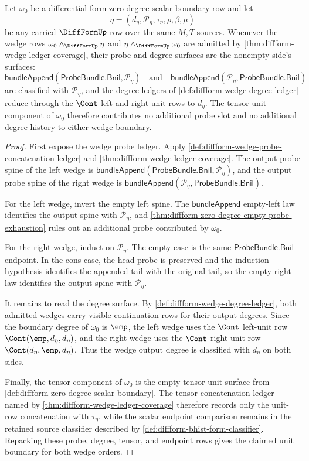 \begin{theorem}
\label{thm:diffform-zero-degree-wedge-cont-unit-boundary}
Let $\omega_0$ be a differential-form zero-degree scalar boundary row and let
$$
\eta=(d_\eta,\mathcal{P}_\eta,\tau_\eta,\rho,\beta,\mu)
$$
be any carried $\DiffFormUp$ row over the same $M,T$ sources. Whenever the
wedge rows $\omega_0\wedge_{\DiffFormUp}\eta$ and
$\eta\wedge_{\DiffFormUp}\omega_0$ are admitted by
\autoref{thm:diffform-wedge-ledger-coverage}, their probe and degree surfaces
are the nonempty side's surfaces:
$$
\mathsf{bundleAppend}(\mathsf{ProbeBundle.Bnil},\mathcal{P}_\eta)
\quad\text{and}\quad
\mathsf{bundleAppend}(\mathcal{P}_\eta,\mathsf{ProbeBundle.Bnil})
$$
are classified with $\mathcal{P}_\eta$, and the degree ledgers of
\autoref{def:diffform-wedge-degree-ledger} reduce through the $\Cont$ left
and right unit rows to $d_\eta$. The tensor-unit component of $\omega_0$
therefore contributes no additional probe slot and no additional degree
history to either wedge boundary.
\end{theorem}
\begin{proof}
First expose the wedge probe ledger. Apply
\autoref{def:diffform-wedge-probe-concatenation-ledger} and
\autoref{thm:diffform-wedge-ledger-coverage}. The output probe spine of the
left wedge is
$\mathsf{bundleAppend}(\mathsf{ProbeBundle.Bnil},\mathcal{P}_\eta)$, and the
output probe spine of the right wedge is
$\mathsf{bundleAppend}(\mathcal{P}_\eta,\mathsf{ProbeBundle.Bnil})$.

For the left wedge, invert the empty left spine. The
$\mathsf{bundleAppend}$ empty-left law identifies the output spine with
$\mathcal{P}_\eta$, and
\autoref{thm:diffform-zero-degree-empty-probe-exhaustion} rules out an
additional probe contributed by $\omega_0$.

For the right wedge, induct on $\mathcal{P}_\eta$. The empty case is the
same $\mathsf{ProbeBundle.Bnil}$ endpoint. In the cons case, the head probe is
preserved and the induction hypothesis identifies the appended tail with the
original tail, so the empty-right law identifies the output spine with
$\mathcal{P}_\eta$.

It remains to read the degree surface. By
\autoref{def:diffform-wedge-degree-ledger}, both admitted wedges carry
visible continuation rows for their output degrees. Since the boundary degree
of $\omega_0$ is $\emp$, the left wedge uses the $\Cont$ left-unit row
$\Cont(\emp,d_\eta,d_\eta)$, and the right wedge uses the $\Cont$ right-unit
row $\Cont(d_\eta,\emp,d_\eta)$. Thus the wedge output degree is classified
with $d_\eta$ on both sides.

Finally, the tensor component of $\omega_0$ is the empty tensor-unit surface
from \autoref{def:diffform-zero-degree-scalar-boundary}. The tensor
concatenation ledger named by
\autoref{thm:diffform-wedge-ledger-coverage} therefore records only the
unit-row concatenation with $\tau_\eta$, while the scalar endpoint comparison
remains in the retained source classifier described by
\autoref{def:diffform-bhist-form-classifier}. Repacking these probe, degree,
tensor, and endpoint rows gives the claimed unit boundary for both wedge
orders.
\end{proof}

